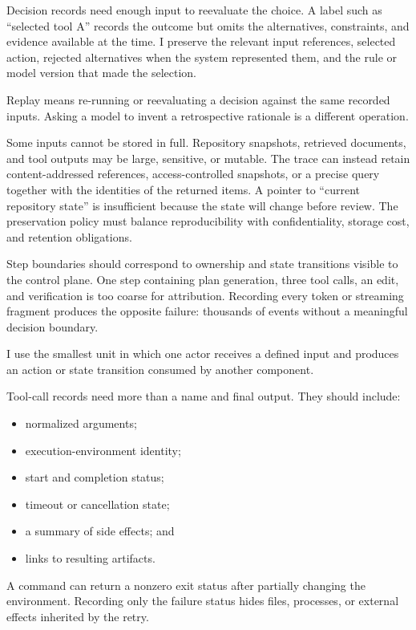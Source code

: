 Decision records need enough input to reevaluate the choice. A label such as ``selected tool A'' records the outcome but omits the alternatives, constraints, and evidence available at the time. I preserve the relevant input references, selected action, rejected alternatives when the system represented them, and the rule or model version that made the selection.

Replay means re-running or reevaluating a decision against the same recorded inputs. Asking a model to invent a retrospective rationale is a different operation.

Some inputs cannot be stored in full. Repository snapshots, retrieved documents, and tool outputs may be large, sensitive, or mutable. The trace can instead retain content-addressed references, access-controlled snapshots, or a precise query together with the identities of the returned items. A pointer to ``current repository state'' is insufficient because the state will change before review. The preservation policy must balance reproducibility with confidentiality, storage cost, and retention obligations.

Step boundaries should correspond to ownership and state transitions visible to the control plane. One step containing plan generation, three tool calls, an edit, and verification is too coarse for attribution. Recording every token or streaming fragment produces the opposite failure: thousands of events without a meaningful decision boundary.

I use the smallest unit in which one actor receives a defined input and produces an action or state transition consumed by another component.

Tool-call records need more than a name and final output. They should include:

\begin{itemize}
\tightlist
\item
  normalized arguments;
\item
  execution-environment identity;
\item
  start and completion status;
\item
  timeout or cancellation state;
\item
  a summary of side effects; and
\item
  links to resulting artifacts.
\end{itemize}

A command can return a nonzero exit status after partially changing the environment. Recording only the failure status hides files, processes, or external effects inherited by the retry.

